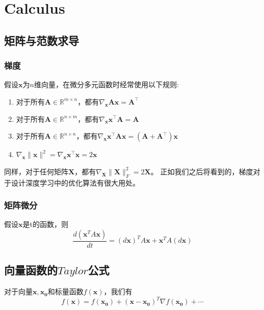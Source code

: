 \documentclass[lang=cn,10pt]{elegantbook}
\newcommand\bv[1]{\boldsymbol{#1}}
\begin{document}
\chapter{Calculus}
\section{矩阵与范数求导}

\subsection{梯度}

\begin{theorem}
	假设$\mathbf{x}$为$n$维向量，在微分多元函数时经常使用以下规则:
	\begin{enumerate}[1、]
		\item     对于所有$\mathbf{A} \in \mathbb{R}^{m \times n}$，都有$\nabla_{\mathbf{x}} \mathbf{A} \mathbf{x} = \mathbf{A}^\top$
		\item 对于所有$\mathbf{A} \in \mathbb{R}^{n \times m}$，都有$\nabla_{\mathbf{x}} \mathbf{x}^\top \mathbf{A}  = \mathbf{A}$
		\item 对于所有$\mathbf{A} \in \mathbb{R}^{n \times n}$，都有$\nabla_{\mathbf{x}} \mathbf{x}^\top \mathbf{A} \mathbf{x}  = (\mathbf{A} + \mathbf{A}^\top)\mathbf{x}$
		\item $\nabla_{\mathbf{x}} \|\mathbf{x} \|^2 = \nabla_{\mathbf{x}} \mathbf{x}^\top \mathbf{x} = 2\mathbf{x}$
	\end{enumerate}
\end{theorem}

同样，对于任何矩阵$\mathbf{X}$，都有$\nabla_{\mathbf{X}} \|\mathbf{X} \|_F^2 = 2\mathbf{X}$。
正如我们之后将看到的，梯度对于设计深度学习中的优化算法有很大用处。

\subsection{矩阵微分}
\begin{corollary}
	假设$\mathbf{x}$是t的函数，则
	\begin{equation}
		\frac{d(\mathbf{x}^TA\mathbf{x})}{dt} = (d\mathbf{x})^TA\mathbf{x} + \mathbf{x}^TA(d\mathbf{x})
	\end{equation}
\end{corollary}



\section{向量函数的$Taylor$公式}\label{eq4.1}
对于向量$\bv{x,x_0}$和标量函数$f(\bv{x})$，我们有
\begin{equation}
	f(\bv{x}) = f(\bv{x_0}) + (\bv{x-x_0})^T\nabla f(\bv{x_0}) + \cdots
\end{equation}
\end{document}
